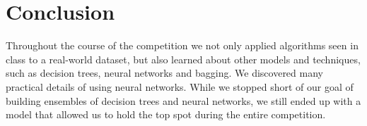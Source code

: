 \documentclass[10pt,conference,compsocconf]{IEEEtran}
\begin{document}
\section{Conclusion}

Throughout the course of the competition we not only applied algorithms seen in class to a real-world dataset, but also learned about other models and techniques, such as decision trees, neural networks and bagging. We  discovered many practical details of using neural networks.
While we stopped short of our goal of building ensembles of decision trees and neural networks, we still ended up with a model that allowed us to hold the top spot during the entire competition.



\end{document}
